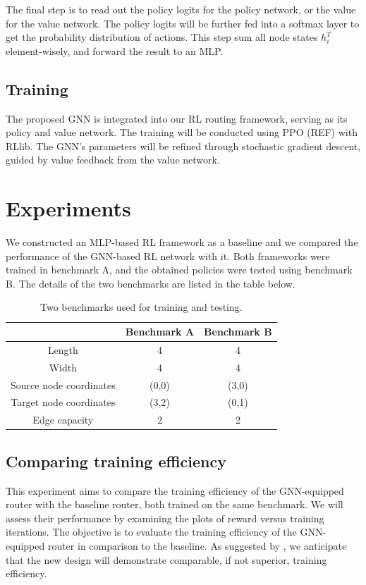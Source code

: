 \documentclass[letterpaper]{article}
\begin{document}
The final step is to read out the policy logits for the policy network, or the value for the value network. The policy logits will be further fed into a softmax layer to get the probability distribution of actions. This step sum all node states $h_i^T$ element-wisely, and forward the result to an MLP.
\subsection{Training}
The proposed GNN is integrated into our RL routing framework, serving as its policy and value network. The training will be conducted using PPO (REF) with RLlib. The GNN's parameters will be refined through stochastic gradient descent, guided by value feedback from the value network.

    
\section{Experiments}
We constructed an MLP-based RL framework as a baseline and we compared the performance of the GNN-based RL network with it. Both frameworks were trained in benchmark A, and the obtained policies were tested using benchmark B. The details of the two benchmarks are listed in the table below.

\begin{table}[h!]
    \caption{Two benchmarks used for training and testing.}
    \centering
    \begin{tabular}{|c c c|}
        \hline
        \hline
         & Benchmark A & Benchmark B \\
        \hline
        Length & 4 & 4 \\
        Width & 4 & 4 \\
        Source node coordinates & (0,0) & (3,0) \\
        Target node coordinates & (3,2) & (0,1) \\
        Edge capacity & 2 & 2 \\
        \hline
        \hline
    \end{tabular}
    \label{tab:benchmark}
    \end{table} 

\subsection{Comparing training efficiency}
This experiment aims to compare the training efficiency of the GNN-equipped router with the baseline router, both trained on the same benchmark. We will assess their performance by examining the plots of reward versus training iterations. The objective is to evaluate the training efficiency of the GNN-equipped router in comparison to the baseline. As suggested by \cite{Wang2018}, we anticipate that the new design will demonstrate comparable, if not superior, training efficiency.
\end{document}
